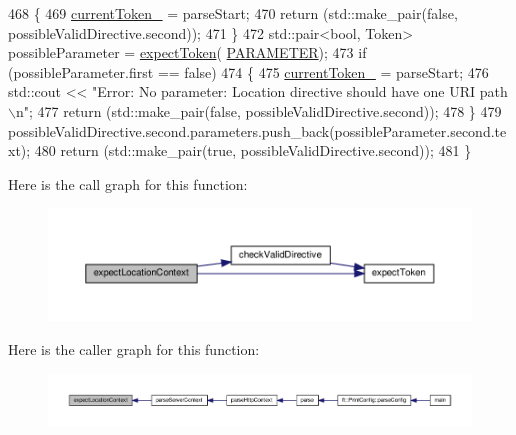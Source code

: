 \begin{DoxyCode}
468         \{
469             \hyperlink{classft_1_1_parser_a942c5b794d108f144c5b5028aaa34cb6}{currentToken\_} = parseStart;
470             \textcolor{keywordflow}{return} (std::make\_pair(\textcolor{keyword}{false}, possibleValidDirective.second));
471         \}
472         std::pair<bool, Token> possibleParameter = \hyperlink{classft_1_1_parser_a1615a752d3642bb53598e2c8db810db0}{expectToken}(
      \hyperlink{namespaceft_aa520fbf142ba1e7e659590c07da31921a194cde856bd2d79eac8adb9741c55940}{PARAMETER});
473         \textcolor{keywordflow}{if} (possibleParameter.first == \textcolor{keyword}{false})
474         \{
475             \hyperlink{classft_1_1_parser_a942c5b794d108f144c5b5028aaa34cb6}{currentToken\_} = parseStart;
476             std::cout << \textcolor{stringliteral}{"Error: No parameter: Location directive should have one URI path\(\backslash\)n"};
477             \textcolor{keywordflow}{return} (std::make\_pair(\textcolor{keyword}{false}, possibleValidDirective.second));
478         \}
479         possibleValidDirective.second.parameters.push\_back(possibleParameter.second.text);
480         \textcolor{keywordflow}{return} (std::make\_pair(\textcolor{keyword}{true}, possibleValidDirective.second));
481     \}
\end{DoxyCode}
Here is the call graph for this function\+:
\nopagebreak
\begin{figure}[H]
\begin{center}
\leavevmode
\includegraphics[width=350pt]{classft_1_1_parser_a002b236022851df6ef2203aab9b24a73_cgraph}
\end{center}
\end{figure}
Here is the caller graph for this function\+:
\nopagebreak
\begin{figure}[H]
\begin{center}
\leavevmode
\includegraphics[width=350pt]{classft_1_1_parser_a002b236022851df6ef2203aab9b24a73_icgraph}
\end{center}
\end{figure}
\mbox{\label{classft_1_1_parser_a72f108d920a35284bf8f740bb8240acd}} 

